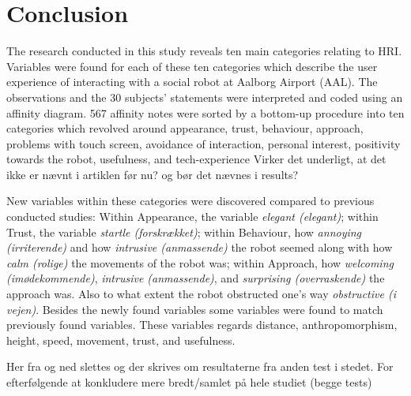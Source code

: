 \section{Conclusion}
\label{Conclusion}
%
The research conducted in this study reveals ten main categories relating to HRI. Variables were found for each of these ten categories which describe the user experience of interacting with a social robot at Aalborg Airport (AAL). The observations and the 30 subjects' statements were interpreted and coded using an affinity diagram. 567 affinity notes were sorted by a bottom-up procedure into ten categories which revolved around appearance, trust, behaviour, approach, problems with touch screen, avoidance of interaction, personal interest, positivity towards the robot, usefulness, and tech-experience {\color{red} Virker det underligt, at det ikke er nævnt i artiklen før nu? og bør det nævnes i results?}

New variables within these categories were discovered compared to previous conducted studies: Within Appearance, the variable \textit{elegant (elegant)}; within Trust, the variable \textit{startle (forskrækket)}; within Behaviour, how \textit{annoying (irriterende)} and how \textit{intrusive (anmassende)} the robot seemed along with how \textit{calm (rolige)} the movements of the robot was; within Approach, how \textit{welcoming (imødekommende)}, \textit{intrusive (anmassende)}, and \textit{surprising (overraskende)} the approach was. Also to what extent the robot obstructed one's way \textit{obstructive (i vejen)}. Besides the newly found variables some variables were found to match previously found variables. These variables regards distance, anthropomorphism, height, speed, movement, trust, and usefulness.

{\color{red} Her fra og ned slettes og der skrives om resultaterne fra anden test i stedet. For efterfølgende at konkludere mere bredt/samlet på hele studiet (begge tests)}


